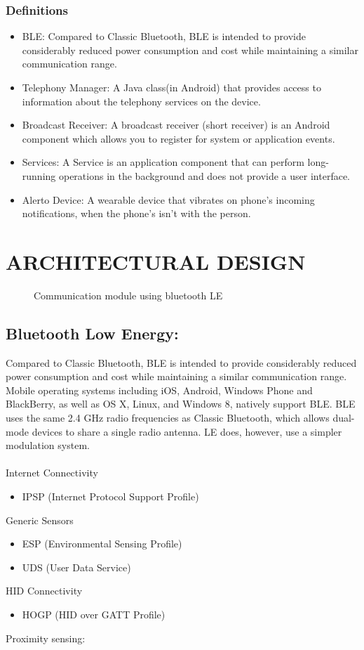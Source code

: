 \documentclass[12pt,a4paper]{report}
\begin{document}
\subsubsection{Definitions}
\begin{itemize}
\item BLE: Compared to Classic Bluetooth, BLE is intended to provide considerably reduced power consumption and cost while maintaining a similar communication range.
\item Telephony Manager: A Java class(in Android) that provides access to information about the telephony services on the device. 
\item Broadcast Receiver: A broadcast receiver (short receiver) is an Android component which allows you to register for system or application events.
\item Services: A Service is an application component that can perform long-running operations in the background and does not provide a user interface.
\item Alerto Device: A wearable device that vibrates on phone's incoming notifications, when the phone's isn't with the person.
\end{itemize}

\section{ARCHITECTURAL DESIGN}
\begin{figure}[h]
	\begin{center}
		\caption{Communication module using bluetooth LE}
	\end{center}
\end{figure}
\subsection{Bluetooth Low Energy:}

\hspace{0.5in}Compared to Classic Bluetooth, BLE is intended to provide considerably reduced power consumption and cost while maintaining a similar communication range. Mobile operating systems including iOS, Android, Windows Phone and BlackBerry, as well as OS X, Linux, and Windows 8, natively support BLE. BLE uses the same 2.4 GHz radio frequencies as Classic Bluetooth, which allows dual-mode devices to share a single radio antenna. LE does, however, use a simpler modulation system.\\\\
Internet Connectivity
\begin{itemize}
	\item IPSP (Internet Protocol Support Profile)
\end{itemize}
Generic Sensors
\begin{itemize}
	\item	ESP (Environmental Sensing Profile)
	\item	UDS (User Data Service)
\end{itemize}
HID Connectivity
\begin{itemize}
	\item HOGP (HID over GATT Profile)
\end{itemize}
Proximity sensing:
\end{document}
